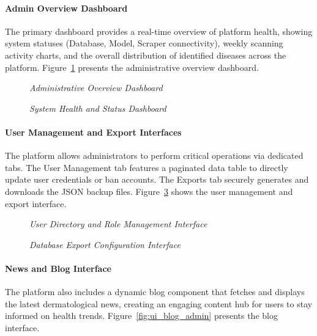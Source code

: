\paragraph{Admin Overview Dashboard}
The primary dashboard provides a real-time overview of platform health, showing system statuses (Database, Model, Scraper connectivity), weekly scanning activity charts, and the overall distribution of identified diseases across the platform. Figure~\ref{fig:ui_admin_overview} presents the administrative overview dashboard.

\begin{figure}[H]
	\centering
	\caption{\textit{Administrative Overview Dashboard}}
	\label{fig:ui_admin_overview}
\end{figure}

\begin{figure}[H]
	\centering
	\caption{\textit{System Health and Status Dashboard}}
	\label{fig:ui_system_health}
\end{figure}

\paragraph{User Management and Export Interfaces}
The platform allows administrators to perform critical operations via dedicated tabs. The User Management tab features a paginated data table to directly update user credentials or ban accounts. The Exports tab securely generates and downloads the JSON backup files. Figure~\ref{fig:ui_admin_users} shows the user management and export interface.

\begin{figure}[H]
	\centering
	\caption{\textit{User Directory and Role Management Interface}}
	\label{fig:ui_admin_users}
\end{figure}

\begin{figure}[H]
	\centering
	\caption{\textit{Database Export Configuration Interface}}
	\label{fig:ui_admin_exports}
\end{figure}

\paragraph{News and Blog Interface}
The platform also includes a dynamic blog component that fetches and displays the latest dermatological news, creating an engaging content hub for users to stay informed on health trends. Figure~\ref{fig:ui_blog_admin} presents the blog interface.


